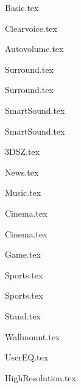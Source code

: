 {Basic.tex}

{Clearvoice.tex}

{Autovolume.tex}

{Surround.tex}

{Surround.tex}

{SmartSound.tex}

{SmartSound.tex}

{3DSZ.tex}

{News.tex}

{Music.tex}

{Cinema.tex}

{Cinema.tex}

{Game.tex}

{Sports.tex}

{Sports.tex}

{Stand.tex}

{Wallmount.tex}

{UserEQ.tex}

{HighResolution.tex}